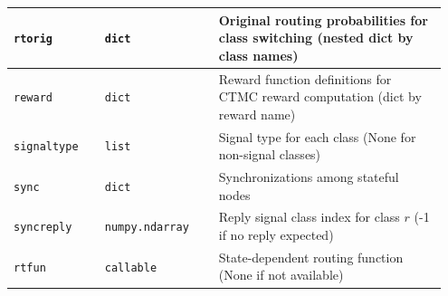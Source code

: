 \begin{PYTHON}
{\begin{longtable}{|p{0.20\linewidth}|p{0.25\linewidth}|p{0.50\linewidth}|}
\texttt{rtorig} & \texttt{dict} & Original routing probabilities for class switching (nested dict by class names)\\\hline
\texttt{reward} & \texttt{dict} & Reward function definitions for CTMC reward computation (dict by reward name)\\\hline
\texttt{signaltype} & \texttt{list} & Signal type for each class (None for non-signal classes)\\\hline
\texttt{sync} & \texttt{dict} & Synchronizations among stateful nodes\\\hline
\texttt{syncreply} & \texttt{numpy.ndarray} & Reply signal class index for class $r$ (-1 if no reply expected)\\\hline
\texttt{rtfun} & \texttt{callable} & State-dependent routing function (None if not available)\\\hline
\end{longtable}
}
\end{PYTHON}

